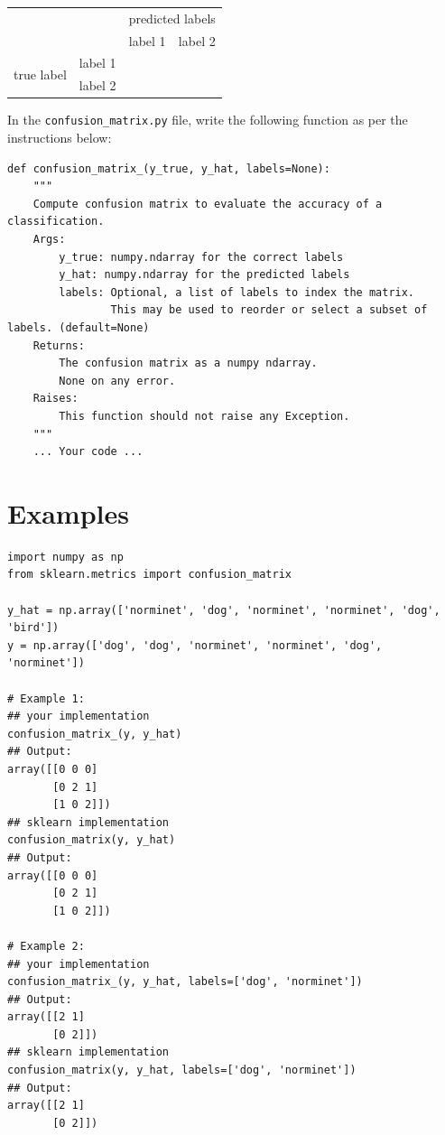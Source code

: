 \documentclass{42-en}
\begin{document}
\begin{center}
  \begin{tabular}{|c|c|c|c|}
    \cline{3-4}
    \multicolumn{2}{c|}{\multirow{2}{*}{}}  & \multicolumn{2}{|c|}{predicted labels} \\ \cline{3-4}
    \multicolumn{2}{c|}{}       & label 1 & label 2 \\
    \hline
    \multirow{2}{*}{true label} & label 1 &         &         \\
    \cline{2-4}
                                & label 2 &         &         \\
    \hline
  \end{tabular}
\end{center}

In the \texttt{confusion\_matrix.py} file, write the following function as per the instructions below:

\begin{verbatim}
def confusion_matrix_(y_true, y_hat, labels=None):
    """
    Compute confusion matrix to evaluate the accuracy of a classification.
    Args:
        y_true: numpy.ndarray for the correct labels
        y_hat: numpy.ndarray for the predicted labels
        labels: Optional, a list of labels to index the matrix.
                This may be used to reorder or select a subset of labels. (default=None)
    Returns: 
        The confusion matrix as a numpy ndarray.
        None on any error.
    Raises:
        This function should not raise any Exception.
    """
    ... Your code ...
\end{verbatim}


\section*{Examples}
\begin{verbatim}
import numpy as np
from sklearn.metrics import confusion_matrix

y_hat = np.array(['norminet', 'dog', 'norminet', 'norminet', 'dog', 'bird'])
y = np.array(['dog', 'dog', 'norminet', 'norminet', 'dog', 'norminet'])

# Example 1: 
## your implementation
confusion_matrix_(y, y_hat)
## Output:
array([[0 0 0]
       [0 2 1]
       [1 0 2]])
## sklearn implementation
confusion_matrix(y, y_hat)
## Output:
array([[0 0 0]
       [0 2 1]
       [1 0 2]])

# Example 2:
## your implementation
confusion_matrix_(y, y_hat, labels=['dog', 'norminet'])
## Output:
array([[2 1]
       [0 2]])
## sklearn implementation
confusion_matrix(y, y_hat, labels=['dog', 'norminet'])
## Output:
array([[2 1]
       [0 2]])
\end{verbatim}
\end{document}
